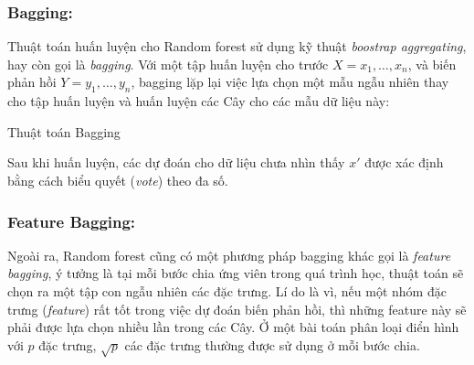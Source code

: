 \subsubsection{Bagging:} Thuật toán huấn luyện cho Random forest sử dụng kỹ thuật \emph{boostrap aggregating}, hay còn gọi là \emph{bagging}. Với một tập huấn luyện cho trước $X = x_1,\dots,x_n$, và biến phản hồi $Y=y_1,\dots,y_n$, bagging lặp lại việc lựa chọn một mẫu ngẫu nhiên thay cho tập huấn luyện và huấn luyện các Cây cho các mẫu dữ liệu này:
      \begin{algorithm}[h!]
            \DontPrintSemicolon
          \caption{Thuật toán Bagging}
          \label{alg:Bagging}
      \end{algorithm}
      Sau khi huấn luyện, các dự đoán cho dữ liệu chưa nhìn thấy $x'$ được xác định bằng cách biểu quyết (\emph{vote}) theo đa số.
\subsubsection{Feature Bagging:} 
      Ngoài ra, Random forest cũng có một phương pháp bagging khác gọi là \emph{feature bagging}, ý tưởng là tại mỗi bước chia ứng viên trong quá trình học, thuật toán sẽ chọn ra một tập con ngẫu nhiên các đặc trưng. Lí do là vì, nếu một nhóm đặc trưng (\emph{feature}) rất tốt trong việc dự đoán biến phản hồi, thì những feature này sẽ phải được lựa chọn nhiều lần trong các Cây. Ở một bài toán phân loại điển hình với $p$ đặc trưng, $\sqrt{p}$ các đặc trưng thường được sử dụng ở mỗi bước chia. 

